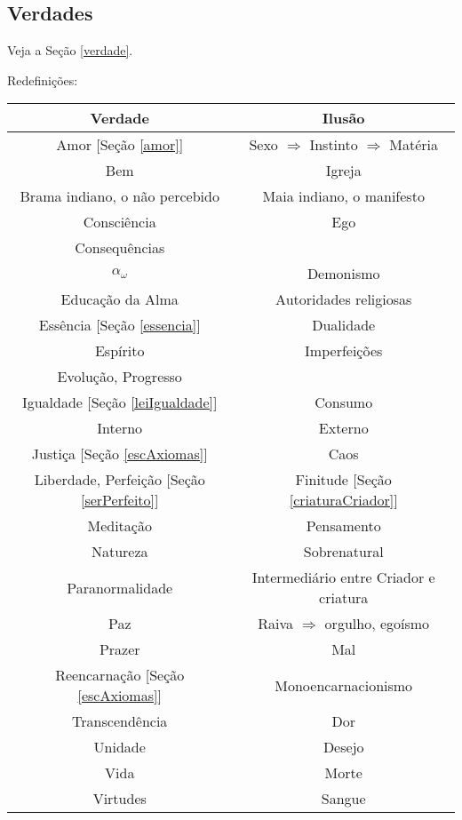 \documentclass[12pt,a4paper]{article}
\begin{document}
		\begin{center}
		\end{center}

		\subsection{Verdades}
			\begin{flushright}
			\end{flushright}

			Veja a Se\c{c}\~ao \ref{verdade}.

			Redefini\c{c}\~oes:

			\begin{center}
				\begin{tabular}{|c|c|}
					\hline
					Verdade & Ilus\~ao \\
					\hline
					Amor [Se\c{c}\~ao \ref{amor}] & Sexo $ \Rightarrow $ Instinto $ \Rightarrow $ Mat\'eria \\
					Bem & Igreja\cite{igreja} \\
					Brama indiano, o n\~ao percebido & Maia indiano, o manifesto \\
					Consci\^encia & Ego \\
					Consequ\^encias &  \\
					$ \alpha_\omega $ & Demonismo\cite{demomono} \\
					Educa\c{c}\~ao da Alma & Autoridades religiosas \\
					Ess\^encia [Se\c{c}\~ao \ref{essencia}] & Dualidade \\
					Esp\'irito & Imperfei\c{c}\~oes \\
					Evolu\c{c}\~ao, Progresso & \\
					Igualdade [Se\c{c}\~ao \ref{leiIgualdade}] & Consumo \\
					Interno & Externo\\
					Justi\c{c}a [Se\c{c}\~ao \ref{escAxiomas}] & Caos \\
					Liberdade\cite{liberdade}, Perfei\c{c}\~ao [Se\c{c}\~ao \ref{serPerfeito}] & Finitude [Se\c{c}\~ao \ref{criaturaCriador}] \\
					Medita\c{c}\~ao & Pensamento \\
					Natureza & Sobrenatural \\
					Paranormalidade & Intermedi\'ario entre Criador e criatura \\
					Paz & Raiva\cite{bomCombate} $ \Rightarrow $ orgulho, ego\'ismo \\
					Prazer & Mal \\
					Reencarna\c{c}\~ao [Se\c{c}\~ao \ref{escAxiomas}] & Monoencarnacionismo\cite{demomono} \\
					Transcend\^encia & Dor \\
					Unidade \cite{unidade} & Desejo \cite{desejo} \\
					Vida & Morte \\
					Virtudes & Sangue \\
					\hline
				\end{tabular}
			\end{center}
\end{document}
